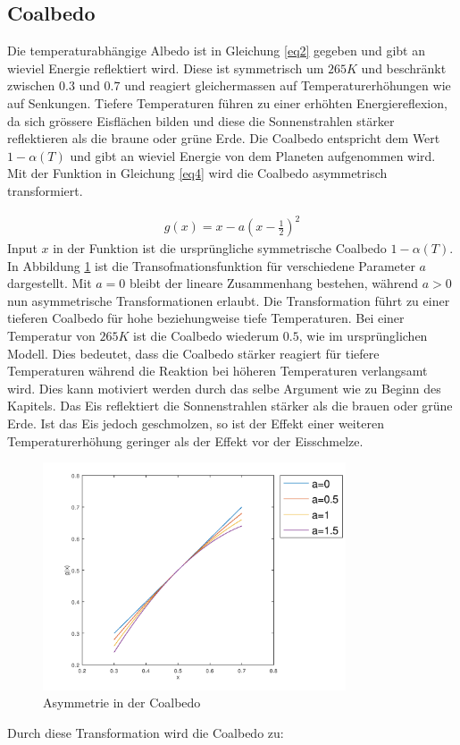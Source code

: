 \begin{refsection}
\subsection{Coalbedo} \label{sec:co} 
Die temperaturabhängige Albedo ist in Gleichung \eqref{eq2} gegeben und gibt an wieviel Energie reflektiert wird. Diese ist symmetrisch um $265 K$ und beschränkt zwischen $0.3$ und $0.7$ und reagiert gleichermassen auf Temperaturerhöhungen wie auf Senkungen. Tiefere Temperaturen führen zu einer erhöhten Energiereflexion, da sich grössere Eisflächen bilden und diese die Sonnenstrahlen stärker reflektieren als die braune oder grüne Erde. Die Coalbedo entspricht dem Wert $1-\alpha(T)$ und gibt an wieviel Energie von dem Planeten aufgenommen wird. Mit der Funktion in Gleichung \ref{eq4} wird die Coalbedo asymmetrisch transformiert. 

\begin{eqnarray} \label{eq4}
g(x)=x-a(x-\frac{1}{2})^2
\end{eqnarray}
Input $x$ in der Funktion ist die ursprüngliche symmetrische Coalbedo $1-\alpha(T)$. In Abbildung \ref{fig:abb10} ist die Transofmationsfunktion für verschiedene Parameter $a$ dargestellt. Mit $a=0$ bleibt der lineare Zusammenhang bestehen, während $a>0$ nun asymmetrische Transformationen erlaubt. Die Transformation führt zu einer tieferen Coalbedo für hohe beziehungweise tiefe Temperaturen. Bei einer Temperatur von $265 K$ ist die Coalbedo wiederum $0.5$, wie im ursprünglichen Modell. Dies bedeutet, dass die Coalbedo stärker reagiert für tiefere Temperaturen während die Reaktion bei höheren Temperaturen verlangsamt wird. Dies kann motiviert werden durch das selbe Argument wie zu Beginn des Kapitels. Das Eis reflektiert die Sonnenstrahlen stärker als die brauen oder grüne Erde. Ist das Eis jedoch geschmolzen, so ist der Effekt einer weiteren Temperaturerhöhung geringer als der Effekt vor der Eisschmelze. 
%
\begin{figure}
	\centering
	\includegraphics[width= 0.8\textwidth]{Funktion.png}
	\caption[Asymmetrie in der Coalbedo]{Asymmetrie in der Coalbedo}
	\label{fig:abb10}
\end{figure}
%
Durch diese Transformation wird die Coalbedo zu:


\end{refsection}
